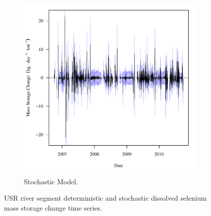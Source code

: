 \begin{linenumbers}
\begin{landscape}
\begin{figure}
\begin{subfigure}{0.7\textwidth}
			\includegraphics[width=\tableCustomSize]{"Figures/Results_USR/Stochastic/f Segment D"}
			\caption{Stochastic Model.}
		\end{subfigure}
		\caption{USR river segment deterministic and stochastic dissolved selenium mass storage change time series.}
	\end{figure}
\end{landscape}


\end{linenumbers}
